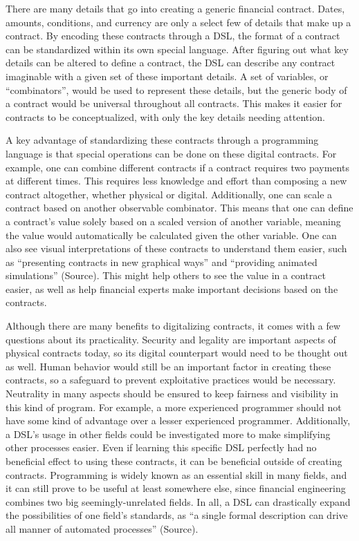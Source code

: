 \documentclass{article}
\theoremstyle{theorem}
\theoremstyle{definition}
\theoremstyle{remark}
\begin{document}
There are many details that go into creating a generic financial contract. Dates, amounts, conditions, and currency are only a select few of details that make up a contract. By encoding these contracts through a DSL, the format of a contract can be standardized within its own special language. After figuring out what key details can be altered to define a contract, the DSL can describe any contract imaginable with a given set of these important details. A set of variables, or “combinators”, would be used to represent these details, but the generic body of a contract would be universal throughout all contracts. This makes it easier for contracts to be conceptualized, with only the key details needing attention.

A key advantage of standardizing these contracts through a programming language is that special operations can be done on these digital contracts. For example, one can combine different contracts if a contract requires two payments at different times. This requires less knowledge and effort than composing a new contract altogether, whether physical or digital. Additionally, one can scale a contract based on another observable combinator. This means that one can define a contract’s value solely based on a scaled version of another variable, meaning the value would automatically be calculated given the other variable. One can also see visual interpretations of these contracts to understand them easier, such as “presenting contracts in new graphical ways” and “providing animated simulations” (Source). This might help others to see the value in a contract easier, as well as help financial experts make important decisions based on the contracts.

Although there are many benefits to digitalizing contracts, it comes with a few questions about its practicality. Security and legality are important aspects of physical contracts today, so its digital counterpart would need to be thought out as well. Human behavior would still be an important factor in creating these contracts, so a safeguard to prevent exploitative practices would be necessary. Neutrality in many aspects should be ensured to keep fairness and visibility in this kind of program. For example, a more experienced programmer should not have some kind of advantage over a lesser experienced programmer. Additionally, a DSL’s usage in other fields could be investigated more to make simplifying other processes easier. Even if learning this specific DSL perfectly had no beneficial effect to using these contracts, it can be beneficial outside of creating contracts. Programming is widely known as an essential skill in many fields, and it can still prove to be useful at least somewhere else, since financial engineering combines two big seemingly-unrelated fields. In all, a DSL can drastically expand the possibilities of one field’s standards, as “a single formal description can drive all manner of automated processes” (Source).\\
\end{document}
